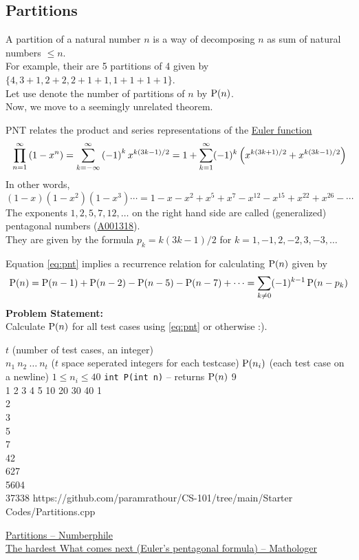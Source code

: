 \documentclass[../../Problems]{subfiles}
\begin{document}
\subsection{Partitions}
A partition of a natural number $n$ is a way of decomposing $n$ as sum of natural numbers $\leq n$.\\
For example, their are 5 partitions of 4 given by $\{4, 3+1, 2+2, 2+1+1, 1+1+1+1\}$.\\
Let use denote the number of partitions of $n$ by $\operatorname{P}(n)$.\\
Now, we move to a seemingly unrelated theorem.
\begin{theorem}
	PNT relates the product and series representations of the \href{https://en.wikipedia.org/wiki
	/Euler_function}{Euler function}
	\begin{equation}{\label{eq:pnt}}
		\prod_{n=1}^{\infty}\left(1-x^{n}\right)=\sum_{k=-\infty }^{\infty }\left(-1\right)^{k}x^{k\left(3k-1\right)/2}=1+\sum _{k=1}^{\infty }(-1)^{k}\left(x^{k(3k+1)/2}+x^{k(3k-1)/2}\right)
	\end{equation}
	In other words,
	\begin{equation*}
		(1-x)(1-x^{2})(1-x^{3})\cdots =1-x-x^{2}+x^{5}+x^{7}-x^{12}-x^{15}+x^{22}+x^{26}-\cdots
	\end{equation*}
	The exponents $1, 2, 5, 7, 12,\ldots$ on the right hand side are called (generalized) pentagonal numbers (\href{https://oeis.org/A001318}{A001318}).\\
	They are given by the formula $p_k = k(3k - 1)/2$ for $k = 1, -1, 2, -2, 3,-3,\ldots$
\end{theorem}
Equation \ref{eq:pnt} implies a recurrence relation for calculating $\operatorname{P}(n)$ given by
\begin{equation}
	\operatorname{P}(n)=\operatorname{P}(n-1)+\operatorname{P}(n-2)-\operatorname{P}(n-5)-\operatorname{P}(n-7)+\cdots = \sum_{k\neq 0}(-1)^{k-1}\operatorname{P}(n-p_{k})
\end{equation}
\textbf{Problem Statement:}\\
Calculate $\operatorname{P}(n)$ for all test cases using \ref{eq:pnt} or otherwise :).
\begin{testcasesFunction}
	{$t$ \hfill(number of test cases, an integer)\\
	$n_1\ n_2\ \ldots\ n_t$ \hfill($t$ space seperated integers for each testcase)}
	{$\operatorname{P}(n_i)$ \hfill(each test case on a newline)}
	{$1 \leq n_i \leq 40$}
	{\texttt{int P(int n)} -- returns $\operatorname{P}(n)$ }%
	{9\\1 2 3 4 5 10 20 30 40}
	{1\\2\\3\\5\\7\\42\\627\\5604\\37338}
	{https://github.com/paramrathour/CS-101/tree/main/Starter Codes/Partitions.cpp}
\end{testcasesFunction}
\begin{funvideo}
\href{https://youtu.be/NjCIq58rZ8I}{Partitions -- Numberphile}\\
\href{https://youtu.be/iJ8pnCO0nTY}{The hardest What comes next (Euler's pentagonal formula) -- Mathologer}
\end{funvideo}
\end{document}
